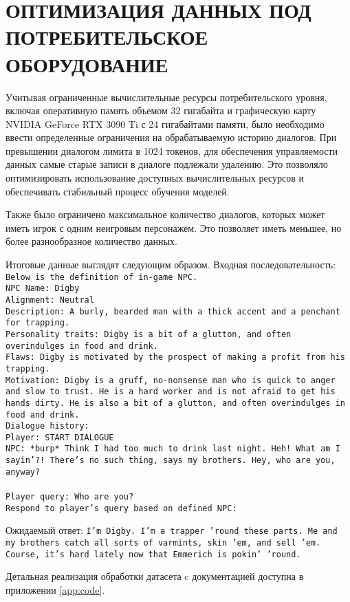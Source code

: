 \section{ОПТИМИЗАЦИЯ ДАННЫХ ПОД ПОТРЕБИТЕЛЬСКОЕ ОБОРУДОВАНИЕ}

Учитывая ограниченные вычислительные ресурсы потребительского уровня, включая оперативную память объемом 32 гигабайта и графическую карту NVIDIA GeForce RTX 3090 Ti с 24 гигабайтами памяти, было необходимо ввести определенные ограничения на обрабатываемую историю диалогов. При превышении диалогом лимита в 1024 токенов, для обеспечения управляемости данных самые старые записи в диалоге подлежали удалению. Это позволяло оптимизировать использование доступных вычислительных ресурсов и обеспечивать стабильный процесс обучения моделей. 

Также было ограничено максимальное количество диалогов, которых может иметь игрок с одним неигровым персонажем. Это позволяет иметь меньшее, но более разнообразное количество данных.

Итоговые данные выглядят следующим образом.
Входная последовательность:
\texttt{\\Below is the definition of in-game NPC.\\
    NPC Name: Digby\\
    Alignment: Neutral\\
    Description: A burly, bearded man with a thick accent and a penchant for trapping.\\
    Personality traits: Digby is a bit of a glutton, and often overindulges in food and drink.\\
    Flaws: Digby is motivated by the prospect of making a profit from his trapping.\\
    Motivation: Digby is a gruff, no-nonsense man who is quick to anger and slow to trust. He is a hard worker and is not afraid to get his hands dirty. He is also a bit of a glutton, and often overindulges in food and drink.\\
    Dialogue history:\\
    Player: START DIALOGUE\\
    NPC: *burp* Think I had too much to drink last night. Heh! What am I sayin'?! There's no such thing, says my brothers. Hey, who are you, anyway?\\\\
    Player query: Who are you?\\
    Respond to player's query based on defined NPC:\\}

Ожидаемый ответ: \texttt{I'm Digby. I'm a trapper 'round these parts. Me and my brothers catch all sorts of varmints, skin 'em, and sell 'em. Course, it's hard lately now that Emmerich is pokin' 'round.}

Детальная реализация обработки датасета c документацией доступна в приложении \ref{app:code}.